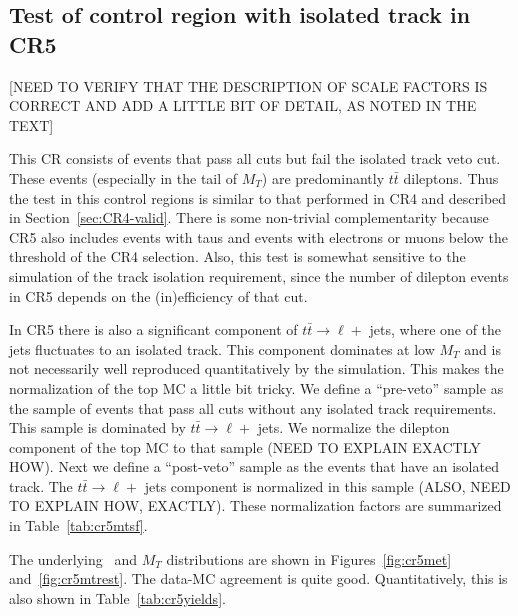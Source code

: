 \subsection{Test of control region with isolated track in CR5}
\label{sec:CR5}

[NEED TO VERIFY THAT THE DESCRIPTION OF SCALE FACTORS IS CORRECT AND
ADD A LITTLE BIT OF DETAIL, AS NOTED IN THE TEXT]

This CR consists of events that pass all cuts but fail the isolated
track veto cut.  These events (especially in the tail of $M_T$) are 
predominantly $t\bar{t}$ dileptons.  Thus the test in this control
regions is similar to that performed in CR4 and described
in Section~\ref{sec:CR4-valid}.  There is some non-trivial 
complementarity because CR5 also includes events with 
taus and events with electrons or muons below the threshold of
the CR4 selection.  Also, this test is somewhat sensitive to
the simulation of the track isolation requirement, since the
number of dilepton events in CR5 depends on the (in)efficiency 
of that cut.



In CR5 there is also a significant component
of $t\bar{t} \to \ell +$ jets, where one of the jets fluctuates
to an isolated track.  This component dominates at low $M_T$
and is not necessarily well reproduced quantitatively by the 
simulation.  This makes the normalization of the top MC a little bit tricky.
We define a ``pre-veto'' sample as the sample of events that pass
all cuts without any isolated track requirements.  This sample is
dominated by $t\bar{t} \to \ell +$ jets.  We normalize the dilepton
component of the top MC to that sample (NEED TO EXPLAIN EXACTLY HOW).
Next we define a ``post-veto'' sample as the events that have an
isolated track.  The $t\bar{t} \to \ell +$ jets component is 
normalized in this sample (ALSO, NEED TO EXPLAIN HOW, EXACTLY).
These normalization factors are summarized in Table~\ref{tab:cr5mtsf}.

The underlying \met\ and $M_T$ distributions are shown in 
Figures~\ref{fig:cr5met} and~\ref{fig:cr5mtrest}.  The data-MC agreement
is quite good.  Quantitatively, this is also shown in Table~\ref{tab:cr5yields}.


